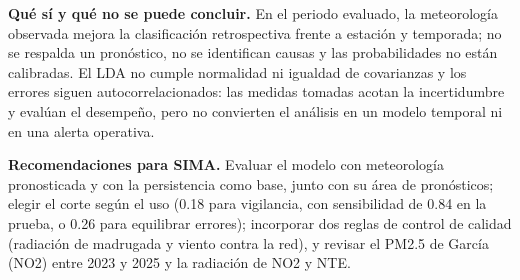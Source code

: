 \textbf{Qué sí y qué no se puede concluir.} En el periodo evaluado, la meteorología observada mejora la clasificación retrospectiva frente a estación y temporada; no se respalda un pronóstico, no se identifican causas y las probabilidades no están calibradas. El LDA no cumple normalidad ni igualdad de covarianzas y los errores siguen autocorrelacionados: las medidas tomadas acotan la incertidumbre y evalúan el desempeño, pero no convierten el análisis en un modelo temporal ni en una alerta operativa.

\textbf{Recomendaciones para SIMA.} Evaluar el modelo con meteorología pronosticada y con la persistencia como base, junto con su área de pronósticos; elegir el corte según el uso (0.18 para vigilancia, con sensibilidad de 0.84 en la prueba, o 0.26 para equilibrar errores); incorporar dos reglas de control de calidad (radiación de madrugada y viento contra la red), y revisar el PM2.5 de García (NO2) entre 2023 y 2025 y la radiación de NO2 y NTE.

\clearpage
